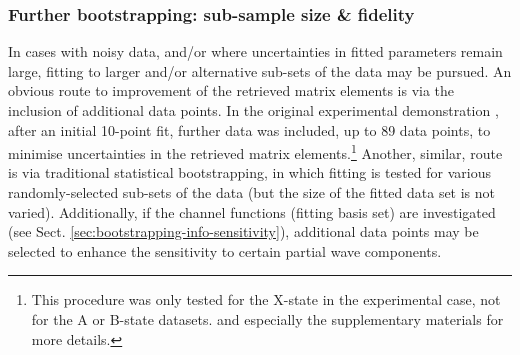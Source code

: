 









\subsubsection{Further bootstrapping: sub-sample size \& fidelity}

In cases with noisy data, and/or where uncertainties in fitted parameters remain large, fitting to larger and/or alternative sub-sets of the data may be pursued.
An obvious route to improvement of the retrieved matrix elements is via the inclusion of additional data points. In the original experimental demonstration \cite{marceau2017MolecularFrameReconstruction}, after an initial 10-point fit, further data was included, up to 89 data points, to minimise uncertainties in the retrieved matrix elements.\footnote{This procedure was only tested for the X-state in the experimental case, not for the A or B-state datasets. %
and especially the supplementary materials for more details.} Another, similar, route is via traditional statistical bootstrapping, in which fitting is tested for various randomly-selected sub-sets of the data (but the size of the fitted data set is not varied). Additionally, if the channel functions (fitting basis set) are investigated (see Sect. \ref{sec:bootstrapping-info-sensitivity}), additional data points may be selected to enhance the sensitivity to certain partial wave components.

